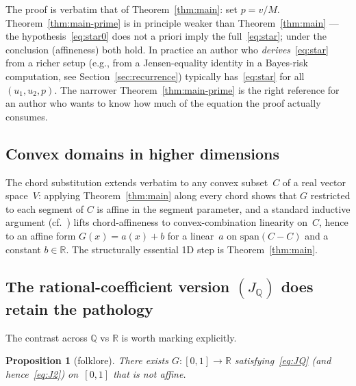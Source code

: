 \documentclass[11pt,a4paper]{amsart}
\newtheorem{proposition}[theorem]{Proposition}
\newcommand{\R}{\mathbb R}
\newcommand{\Q}{\mathbb Q}
\begin{document}
The proof is verbatim that of Theorem~\ref{thm:main}: set $p=v/M$.
Theorem~\ref{thm:main-prime} is in principle weaker than
Theorem~\ref{thm:main} --- the hypothesis~\eqref{eq:star0} does not a priori
imply the full~\eqref{eq:star}; under the conclusion (affineness) both hold.
In practice an author who \emph{derives}~\eqref{eq:star} from a richer setup
(e.g., from a Jensen-equality identity in a Bayes-risk computation, see
Section~\ref{sec:recurrence}) typically has~\eqref{eq:star} for all
$(u_1,u_2,p)$. The narrower Theorem~\ref{thm:main-prime} is the right
reference for an author who wants to know how much of the equation the proof
actually consumes.

\subsection{Convex domains in higher dimensions}
\label{ssec:higher}

The chord substitution extends verbatim to any convex subset~$C$ of a real
vector space~$V$: applying Theorem~\ref{thm:main} along every chord shows
that $G$ restricted to each segment of $C$ is affine in the segment
parameter, and a standard inductive argument
(cf.~\cite{AczelDhombres1989}) lifts chord-affineness to
convex-combination linearity on~$C$, hence to an affine form $G(x) =
a(x)+b$ for a linear~$a$ on $\mathrm{span}(C-C)$ and a constant $b\in\R$.
The structurally essential 1D step is Theorem~\ref{thm:main}.

\subsection{The rational-coefficient version $(J_{\Q})$ does retain the
pathology}
\label{ssec:rational-pathology}

The contrast across $\Q$ vs $\R$ is worth marking explicitly.

\begin{proposition}[folklore]
\label{prop:JQ-pathology}
There exists $G\colon[0,1]\to\R$ satisfying~\eqref{eq:JQ}
(and hence~\eqref{eq:J2}) on~$[0,1]$ that is not affine.
\end{proposition}
\end{document}
